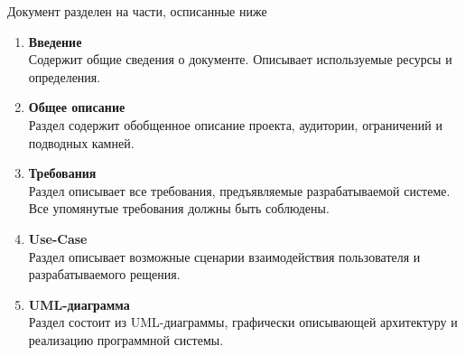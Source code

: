 
Документ разделен на части, осписанные ниже
\begin{enumerate}
    \item \textbf{Введение} \\
          Содержит общие сведения о документе. Описывает
          используемые ресурсы и определения.

    \item \textbf{Общее описание} \\
          Раздел содержит обобщенное описание проекта,
          аудитории, ограничений и подводных камней.

    \item \textbf{Требования} \\
          Раздел описывает все требования, предъявляемые
          разрабатываемой системе. Все упомянутые требования
          должны быть соблюдены.

    \item \textbf{Use-Case} \\
          Раздел описывает возможные сценарии взаимодействия
          пользователя и разрабатываемого рещения.

    \item \textbf{UML-диаграмма} \\
          Раздел состоит из UML-диаграммы, графически
          описывающей архитектуру и реализацию программной
          системы.
\end{enumerate}
